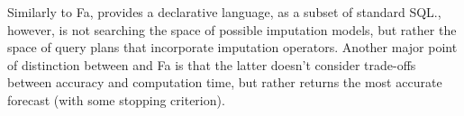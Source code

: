Similarly to Fa, \ProjectName{} provides a declarative language, as
a subset of standard SQL.\@ \ProjectName{}, however, is not searching the space of possible
imputation models, but rather the space of query plans that incorporate imputation operators. Another major point
of distinction between \ProjectName{} and Fa is that the latter doesn't consider trade-offs between accuracy and computation time, but rather returns the most accurate forecast (with some stopping criterion).



